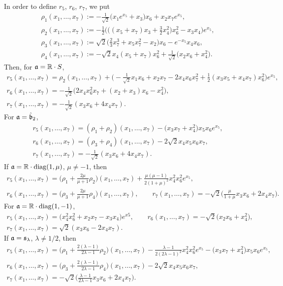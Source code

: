 \documentclass[11pt]{article}
\numberwithin{equation}{section}
\newcommand\fa{{\frak a}}
\newcommand\fb{{\frak b}}
\newcommand\fs{{\frak s}}
\newcommand\RR{{\mathbb R}}
\newcommand{\diag}{\operatorname{diag}}
\begin{document}
In order to define $r_5$, $r_6$, $r_7$, we put
\begin{gather*}
\rho_1(x_1,\dots,x_7) := -\tfrac1{\sqrt2}\big(x_1e^{x_5}+x_3\big)x_6+x_2x_7e^{x_5} ,\\
\rho_2(x_1,\dots,x_7) := -\tfrac12\big(\big((x_5+x_7)x_3+\tfrac32 x_4^2\big)x_6^2-x_3x_4\big)e^{x_5}, \\
\rho_3(x_1,\dots,x_7) := \sqrt 2 \big(\tfrac23 x_7^3+x_5x_7^2-x_2\big)x_6-e^{-x_5}x_4x_6 ,\\
\rho_4(x_1,\dots,x_7) := -\sqrt 2x_4(x_5+x_7)x_6^2+\tfrac 1{\sqrt 2}\big(x_2x_6+x_4^2\big).
\end{gather*}
Then, for $\fa=\RR\cdot S$,
\begin{gather*}
r_5(x_1,\dots, x_7) = \rho_2(x_1,\dots,x_7)+ \big({-}\tfrac 1{\sqrt2} x_1x_6+x_2x_7-2x_4x_6x_7^2+\tfrac12(x_3x_5+x_4x_7)x_6^2\big)e^{x_5},\\
r_6(x_1,\dots, x_7) = -\tfrac 1{\sqrt2}\big( 2x_4x_6^2x_7 +(x_2+x_3)x_6-x_4^2\big) , \\
r_7(x_1,\dots, x_7) = -\tfrac1{\sqrt2}(x_3x_6+4x_4x_7).
\end{gather*}
For $\fa=\hat \fb_2$,
\begin{gather*}
r_5(x_1,\dots, x_7) = (\rho_1+\rho_2)(x_1,\dots,x_7)-\big(x_3x_7+x_4^2\big)x_5x_6 e^{x_5}, \\
r_6(x_1,\dots, x_7) = (\rho_3+\rho_4)(x_1,\dots,x_7)-2\sqrt2 x_4x_5x_6x_7 , \\
r_7(x_1,\dots, x_7) = -\tfrac1{\sqrt2}(x_3x_6+4x_4x_7).
\end{gather*}
If $\fa=\RR\cdot\diag(1,\mu)$, $\mu\not=-1$, then
\begin{gather*}
r_5(x_1,\dots, x_7) = \big(\rho_1+\tfrac{2\mu}{\mu+1}\rho_2\big)(x_1,\dots, x_7)+\tfrac{\mu(\mu-1)}{2(1+\mu)^2}x_4^2x_6^2e^{x_5}, \\
r_6(x_1,\dots, x_7) = \big(\rho_3+\tfrac{2\mu}{\mu+1}\rho_4\big)(x_1,\dots, x_7), \qquad
r_7(x_1,\dots, x_7) = -\sqrt2\big(\tfrac{\mu}{1+\mu}x_3x_6 +2x_4x_7\big).
\end{gather*}
For $\fa=\RR\cdot\diag(1,-1)$,
\begin{gather*}
r_5(x_1,\dots, x_7) = \big(x_4^2x_6^2+x_2x_7-x_3x_4\big)e^{x5}, \qquad
r_6(x_1,\dots, x_7) = -\sqrt2\big(x_2x_6+x_4^2\big), \\
r_7(x_1,\dots, x_7) = \sqrt2(x_3x_6-2x_4x_7).
\end{gather*}
If $\fa=\fs_\lambda$, $\lambda\not=1/2$, then
\begin{gather*}
r_5(x_1,\dots, x_7) = \big(\rho_1+\tfrac{2(\lambda-1)}{2\lambda-1}\rho_2\big)(x_1,\dots,x_7) -\tfrac{\lambda-1}{2(2\lambda-1)^2}x_4^2x_6^2e^{x_5}-\big(x_3x_7+x_4^2\big)x_5x_6e^{x_5}, \\
r_6(x_1,\dots, x_7) = \big(\rho_3+\tfrac{2(\lambda-1)}{2\lambda-1}\rho_4\big)(x_1,\dots,x_7)-2\sqrt2 x_4x_5x_6x_7,\\
r_7(x_1,\dots, x_7) = -\sqrt2 \big(\tfrac{\lambda-1}{2\lambda -1}x_3x_6+2 x_4 x_7\big).
\end{gather*}
\end{document}
